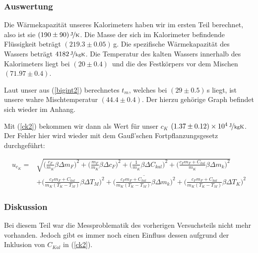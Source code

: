 \documentclass[11pt,a4paper]{article}
\begin{document}
\subsubsection{Auswertung}

Die W\"armekapazit\"at unseres Kalorimeters haben wir im ersten Teil berechnet, also ist sie $(190\pm90)\,\nicefrac{\mathrm{J}}{\mathrm{K}}$. Die Masse der sich im Kalorimeter befindende Fl\"ussigkeit betr\"agt $(219.3\pm0.05)$\,g. Die spezifische W\"armekapazit\"at des Wassers betr\"agt $4182\,\nicefrac{\mathrm{J}}{\mathrm{kgK}}$. Die Temperatur des kalten Wassers innerhalb des Kalorimeters liegt bei $(20\pm0.4)$\celsius\ und die des Festk\"orpers vor dem Mischen $(71.97\pm0.4)$\celsius.

Laut unser aus (\ref{bigint2}) berechnetes $t_m$, welches bei $(29\pm0.5)$\,s liegt, ist unsere wahre Mischtemperatur $(44.4\pm0.4)$\celsius. Der hierzu geh\"orige Graph befindet sich wieder im Anhang.

Mit (\ref{ck2}) bekommen wir dann als Wert f\"ur unser $c_K$ $(1.37\pm0.12)\times10^4\,\nicefrac{\mathrm{J}}{\mathrm{kgK}}$. Der Fehler hier wird wieder mit dem Gau\ss 'schen Fortpflanzungsgesetz durchgef\"uhrt:

\color{purple}

\begin{align*}
 	u_{c_K} = &\sqrt{\bigg(\frac{c_F}{m_K} \beta \Delta m_F\bigg)^2 + \bigg( \frac{m_F}{m_K} \beta \Delta c_F\bigg)^2 + \bigg( \frac{1}{m_K} \beta \Delta C_{kal}\bigg)^2 + \bigg( \frac{c_F m_F + C_{kal}}{m_K} \beta \Delta m_k\bigg)^2}\\
 	& + \overline{\bigg( \frac{c_F m_F + C_{kal}}{m_K (T_K - T_M)} \beta \Delta T_M \bigg)^2 + \bigg( \frac{c_F m_F + C_{kal}}{m_K (T_K - T_M)} \beta \Delta m_k\bigg)^2 + \bigg( \frac{c_F m_F + C_{kal}}{m_K (T_K - T_M)} \beta \Delta T_K \bigg)^2}
\end{align*}

\color{black}

\subsubsection{Diskussion}

Bei diesem Teil war die Messproblematik des vorherigen Versuchsteils nicht mehr vorhanden. Jedoch gibt es immer noch einen Einfluss dessen aufgrund der Inklusion von $C_{Kal}$ in (\ref{ck2}).

\end{document}
